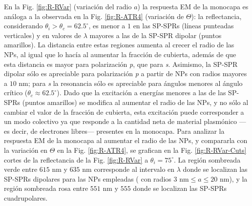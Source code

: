 En la Fig.   \ref{fig:R-RVar} (variación del radio $a$) la respuesta EM de la monocapa es análoga a la observada en la Fig. \ref{fig:R-ATR4} (variación de $\Theta$): la reflectancia, considerando $\theta_i>\theta_c=62.5^\circ$, es menor a $1$ en las SP-SPRs (líneas punteadas verticales) y en valores de $\lambda$ mayores a las de la SP-SPR dipolar (puntos amarillos). La distancia entre estas regiones aumenta al crecer el radio de las NPs, al igual que lo hacía al aumentar la fracción de cubierta, además de que esta distancia es mayor para polarización \emph{p}, que para \emph{s}. Asimismo, la SP-SPR dipolar sólo es apreciable para polarización \emph{p} a partir de NPs con radios mayores a $10$ nm; para \emph{s} la resonancia sólo es apreciable para ángulos menores al ángulo crítico ($\theta_c\approx 62.5^\circ$). Dado que la excitación a energías menores a las de las SP-SPRs (puntos amarillos) se modifica al aumentar el radio de las NPs, y no sólo al cambiar el valor de la fracción de cubierta, esta excitación puede corresponder a un modo colectivo ya que responde a la cantidad neta de material plasmónico ---es decir, de electrones libres--- presentes en la monocapa. Para analizar la respuesta EM de la monocapa al aumentar el radio de las NPs, y compararla con la variación en $\Theta$ en la Fig. \ref{fig:R-ATR4},  se grafican en la Fig. \ref{fig:R-RVar-Cuts}  cortes de la reflectancia de la Fig. \ref{fig:R-RVar} a $\theta_i = 75^\circ$. La región sombreada verde entre $615$ nm y $635$ nm corresponde al intervalo en $\lambda$ donde se localizan las SP-SPRs dipolares para las NPs empleadas ( con radios $3\mbox{ nm}\leq a \leq 20\mbox{ nm}$), y la región sombreada rosa entre $551$ nm y $555$ donde se localizan las SP-SPRs cuadrupolares.

